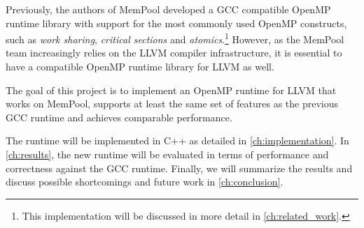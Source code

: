 Previously, the authors of MemPool developed a GCC compatible OpenMP runtime library with support
for the most commonly used OpenMP constructs, such as \emph{work sharing}, \emph{critical sections}
and \emph{atomics}.\footnote{This implementation will be discussed in more detail in
\cref{ch:related_work}.} However, as the MemPool team increasingly relies on the LLVM compiler
infrastructure, it is essential to have a compatible OpenMP runtime library for LLVM as well.

The goal of this project is to implement an OpenMP runtime for LLVM that works on MemPool, supports
at least the same set of features as the previous GCC runtime and achieves comparable performance.

The runtime will be implemented in C++ as detailed in \cref{ch:implementation}. In
\cref{ch:results}, the new runtime will be evaluated in terms of performance and correctness against
the GCC runtime. Finally, we will summarize the results and discuss possible shortcomings and future
work in \cref{ch:conclusion}.

%
%
%

